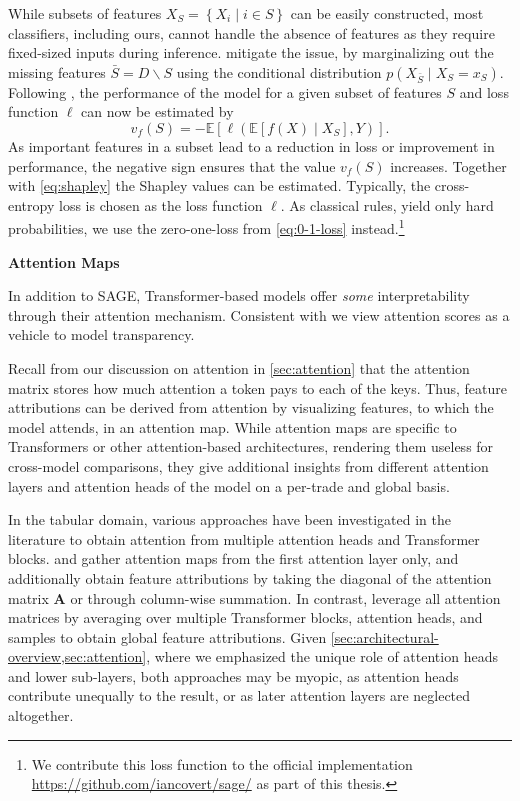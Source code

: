 While subsets of features $X_S = \left\{X_i \mid i \in S \right\}$ can be easily constructed, most classifiers, including ours, cannot handle the absence of features as they require fixed-sized inputs during inference. \textcite[][17213]{covertUnderstandingGlobalFeature2020} mitigate the issue, by marginalizing out the missing features $\bar{S}=D\backslash S$ using the conditional distribution $p(X_{\bar{S}} \mid X_S=x_S)$. Following \textcite[][17215--17216]{covertUnderstandingGlobalFeature2020}, the performance of the model for a given subset of features $S$ and loss function $\ell$ can now be estimated by
\begin{equation}
v_f(S)=-\mathbb{E}\left[\ell\left(\mathbb{E}\left[f(X) \mid X_S\right], Y\right)\right].
\end{equation}
As important features in a subset lead to a reduction in loss or improvement in performance, the negative sign ensures that the value $v_f(S)$ increases. Together with \cref{eq:shapley} the Shapley values can be estimated. Typically, the cross-entropy loss is chosen as the loss function $\ell$. As classical rules, yield only hard probabilities, we use the zero-one-loss from \cref{eq:0-1-loss} instead.\footnote{We contribute this loss function to the official implementation \url{https://github.com/iancovert/sage/} as part of this thesis.} 

\textbf{Attention Maps}

In addition to \gls{SAGE}, Transformer-based models offer \emph{some} interpretability through their attention mechanism. Consistent with \textcite[][18]{wiegreffeAttentionNotNot2019} we view attention scores as a vehicle to model transparency.

Recall from our discussion on attention in \cref{sec:attention} that the attention matrix stores how much attention a token pays to each of the keys. Thus, feature attributions can be derived from attention by visualizing features, to which the model attends, in an attention map. While attention maps are specific to Transformers or other attention-based architectures, rendering them useless for cross-model comparisons, they give additional insights from different attention layers and attention heads of the model on a per-trade and global basis.

In the tabular domain, various approaches have been investigated in the literature to obtain attention from multiple attention heads and Transformer blocks. \textcite[][18]{somepalliSaintImprovedNeural2021} and \textcite[][8]{borisovDeepNeuralNetworks2022} gather attention maps from the first attention layer only, and \textcite[][8]{borisovDeepNeuralNetworks2022} additionally obtain feature attributions by taking the diagonal of the attention matrix $\mathbf{A}$ or through column-wise summation. In contrast, \textcite[][18941]{gorishniyRevisitingDeepLearning2021} leverage all attention matrices by averaging over multiple Transformer blocks, attention heads, and samples to obtain global feature attributions. Given \cref{sec:architectural-overview,sec:attention}, where we emphasized the unique role of attention heads and lower sub-layers, both approaches may be myopic, as attention heads contribute unequally to the result, or as later attention layers are neglected altogether.

